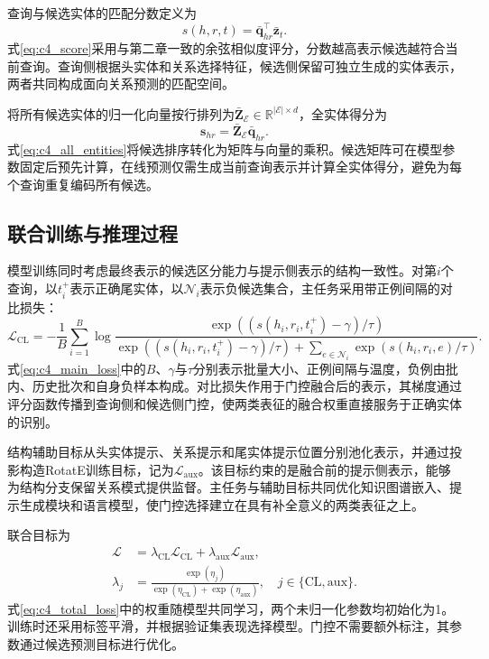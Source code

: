查询与候选实体的匹配分数定义为
\begin{equation}
    s(h,r,t)=\bar{\mathbf{q}}_{hr}^{\top}\bar{\mathbf{z}}_t.
    \label{eq:c4_score}
\end{equation}
式\eqref{eq:c4_score}采用与第二章一致的余弦相似度评分，分数越高表示候选越符合当前查询。查询侧根据头实体和关系选择特征，候选侧保留可独立生成的实体表示，两者共同构成面向关系预测的匹配空间。

将所有候选实体的归一化向量按行排列为$\bar{\mathbf{Z}}_{\mathcal{E}}\in\mathbb{R}^{|\mathcal{E}|\times d}$，全实体得分为
\begin{equation}
    \mathbf{s}_{hr}=\bar{\mathbf{Z}}_{\mathcal{E}}\bar{\mathbf{q}}_{hr}.
    \label{eq:c4_all_entities}
\end{equation}
式\eqref{eq:c4_all_entities}将候选排序转化为矩阵与向量的乘积。候选矩阵可在模型参数固定后预先计算，在线预测仅需生成当前查询表示并计算全实体得分，避免为每个查询重复编码所有候选。

\subsection{联合训练与推理过程}

模型训练同时考虑最终表示的候选区分能力与提示侧表示的结构一致性。对第$i$个查询，以$t_i^+$表示正确尾实体，以$\mathcal{N}_i$表示负候选集合，主任务采用带正例间隔的对比损失：
\begin{equation}
    \mathcal{L}_{\mathrm{CL}}=-\frac1B\sum_{i=1}^{B}
    \log\frac{\exp((s(h_i,r_i,t_i^+)-\gamma)/\tau)}
    {\exp((s(h_i,r_i,t_i^+)-\gamma)/\tau)
        +\sum_{e\in\mathcal{N}_i}\exp(s(h_i,r_i,e)/\tau)}.
    \label{eq:c4_main_loss}
\end{equation}
式\eqref{eq:c4_main_loss}中的$B$、$\gamma$与$\tau$分别表示批量大小、正例间隔与温度，负例由批内、历史批次和自身负样本构成。对比损失作用于门控融合后的表示，其梯度通过评分函数传播到查询侧和候选侧门控，使两类表征的融合权重直接服务于正确实体的识别。

结构辅助目标从头实体提示、关系提示和尾实体提示位置分别池化表示，并通过投影构造RotatE训练目标，记为$\mathcal{L}_{\mathrm{aux}}$。该目标约束的是融合前的提示侧表示，能够为结构分支保留关系模式提供监督。主任务与辅助目标共同优化知识图谱嵌入、提示生成模块和语言模型，使门控选择建立在具有补全意义的两类表征之上。

联合目标为
\begin{equation}
\begin{aligned}
    \mathcal{L}&=\lambda_{\mathrm{CL}}\mathcal{L}_{\mathrm{CL}}
                   +\lambda_{\mathrm{aux}}\mathcal{L}_{\mathrm{aux}},\\
    \lambda_j&=\frac{\exp(\eta_j)}{\exp(\eta_{\mathrm{CL}})+\exp(\eta_{\mathrm{aux}})},
        \quad j\in\{\mathrm{CL},\mathrm{aux}\}.
\end{aligned}
    \label{eq:c4_total_loss}
\end{equation}
式\eqref{eq:c4_total_loss}中的权重随模型共同学习，两个未归一化参数均初始化为1。训练时还采用标签平滑，并根据验证集表现选择模型。门控不需要额外标注，其参数通过候选预测目标进行优化。

